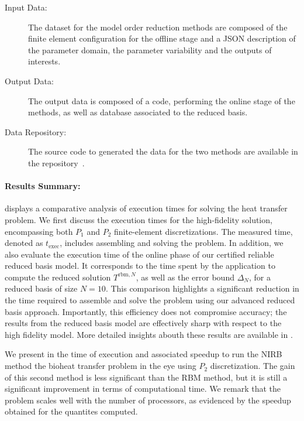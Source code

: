 \begin{description}
    \item[Input Data:] The dataset for the \Feelpp model order reduction methods are composed of the finite element configuration for the offline stage and a JSON description of the parameter domain, the parameter variability and the outputs of interests.
    \item[Output Data:] The output data is composed of a code, performing the online stage of the methods, as well as database associated to the reduced basis.
    \item[Data Repository:] The source code to generated the data for the two methods are available in the \Feelpp repository~\cite{prudhomme_feelppfeelpp_2024}.
\end{description}

\paragraph{Results Summary:}

 displays a comparative analysis of execution times for solving the heat transfer problem.
We first discuss the execution times for the high-fidelity solution, encompassing both $P_1$ and $P_2$ finite-element discretizations.
The measured time, denoted as $t_\text{exec}$, includes assembling and solving the problem.
In addition, we also evaluate the execution time of the online phase of our certified reliable reduced basis model.
It corresponds to the time spent by the application to compute the reduced solution $T^{\text{rbm},N}$, as well as the error bound $\Delta_N$, for a reduced basis of size $N=10$.
This comparison highlights a significant reduction in the time required to assemble and solve the problem using our advanced reduced basis approach.
Importantly, this efficiency does not compromise accuracy; the results from the reduced basis model are effectively sharp with respect to the high fidelity model.
More detailed insights abouth these results are available in \cite{saigre_model_2024}.

We present in  the time of execution and associated speedup to run the NIRB method the bioheat transfer problem in the eye using $P_2$ discretization.
%
The gain of this second method is less significant than the RBM method, but it is still a significant improvement in terms of computational time.
We remark that the problem scales well with the number of processors, as evidenced by the speedup obtained for the quantites computed.



